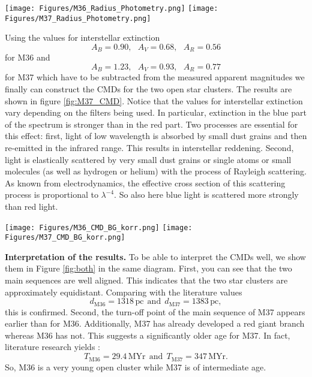 \documentclass[fleqn,10pt]{SelfArx} %
\begin{document}
\begin{figure*}
    \centering
    \texttt{[image: Figures/M36\_Radius\_Photometry.png]}
    \texttt{[image: Figures/M37\_Radius\_Photometry.png]}
    \caption{Stars used for photometry in M36 (left) and M37 (right).}
    \label{fig:M37_rad}
\end{figure*}

Using the values for interstellar extinction
\begin{equation}
    A_B = 0.90, \ \ \ A_V = 0.68, \ \ \ A_R = 0.56
\end{equation}
for M36 and
\begin{equation}
    A_B = 1.23, \ \ \ A_V = 0.93, \ \ \ A_R = 0.77
\end{equation}
for M37 which have to be subtracted from the measured apparent magnitudes we finally can construct the CMDs for the two open star clusters. The results are shown in figure \ref{fig:M37_CMD}. Notice that the values for interstellar extinction vary depending on the filters being used. In particular, extinction in the blue part of the spectrum is stronger than in the red part. Two processes are essential for this effect: first, light of low wavelength is absorbed by small dust grains and then re-emitted in the infrared range. This results in interstellar reddening.  Second, light is elastically scattered by very small dust grains or single atoms or small molecules (as well as hydrogen or helium) with the process of Rayleigh scattering. As known from electrodynamics, the effective cross section of this scattering process is proportional to $\lambda^{-4}$. So also here blue light is scattered more strongly than red light.

\begin{figure*}
    \centering
    \texttt{[image: Figures/M36\_CMD\_BG\_korr.png]}
    \texttt{[image: Figures/M37\_CMD\_BG\_korr.png]}
    \caption{Color-magnitude diagram for M36 (left) and M37 (right) corrected for interstellar extinction.}
    \label{fig:M37_CMD}
\end{figure*}

\textbf{Interpretation of the results.}
To be able to interpret the CMDs well, we show them in Figure \ref{fig:both} in the same diagram. First, you can see that the two main sequences are well aligned. This indicates that the two star clusters are approximately equidistant. Comparing with the literature values \cite{webda}
\begin{equation}
    d_{\mathrm{M36}} = 1318 \, \mathrm{pc} \ \ \mathrm{and} \ \ d_{\mathrm{M37}} = 1383 \, \mathrm{pc},
\end{equation}
this is confirmed. Second, the turn-off point of the main sequence of M37 appears earlier than for M36. Additionally, M37 has already developed a red giant branch whereas M36 has not. This suggests a significantly older age for M37. In fact, literature research yields \cite{webda}:
\begin{equation}
    T_{\mathrm{M36}} = 29.4 \, \mathrm{MYr} \ \ \mathrm{and} \ \ T_{\mathrm{M37}} = 347 \, \mathrm{MYr}.
\end{equation}
So, M36 is a very young open cluster while M37 is of intermediate age.
\end{document}
